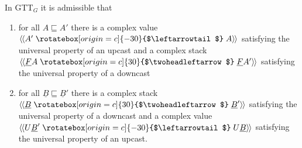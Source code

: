 \documentclass[acmsmall,screen,12pt]{acmart}
\renewcommand{\u}{\underline}
\newcommand{\ltdyn}{\sqsubseteq}
\newcommand{\uarrow}{\mathrel{\rotatebox[origin=c]{-30}{$\leftarrowtail$}}}
\newcommand{\darrow}{\mathrel{\rotatebox[origin=c]{30}{$\twoheadleftarrow$}}}
\newcommand{\defupcast}[2]{\langle\kern-1ex~\langle{#2}\uarrow{#1}\rangle\kern-1ex~\rangle}
\newcommand{\defdncast}[2]{\langle\kern-1ex~\langle{#1}\darrow{#2}\rangle\kern-1ex~\rangle}
\begin{document}
\begin{lemma} \label{lem:casts-admissible}
In GTT$_G$ it is admissible that
\begin{enumerate}
\item for all $A \ltdyn A'$
  there is a complex value $\defupcast{A}{A'}$
  satisfying the universal property of an upcast
  and a complex stack $\defdncast{\u F A}{\u F A'}$
  satisfying the universal property of a downcast
\item for all $\u B \ltdyn \u B'$ there is a complex
  stack $\defdncast{\u B}{\u B'}$ satisfying the universal property of a
  downcast and a complex value $\defupcast{U \u B}{U \u B'}$ satisfying
  the universal property of an upcast.
\end{enumerate}
\end{lemma}
\end{document}

